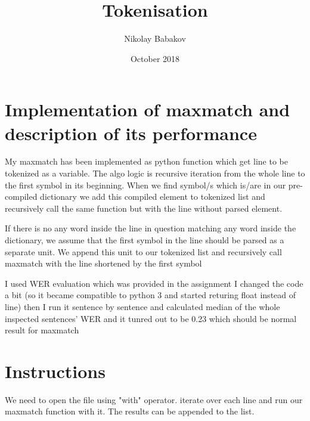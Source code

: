 \documentclass{article}
\title{Tokenisation}
\author{Nikolay Babakov }
\date{October 2018}
\begin{document}
\maketitle

\section{Implementation of maxmatch and description of its performance}
My maxmatch has been implemented as python function which get line to be tokenized as a variable. 
The algo logic is recursive iteration from the whole line to the first symbol in its beginning. 
When we find symbol/s which is/are in our pre-compiled dictionary we add this compiled element to tokenized list 
and recursively call the same function but with the line without parsed element. \newline

If there is no any word inside the line in question matching any word inside the dictionary, 
we assume that the first symbol in the line should be parsed as a separate unit. 
We append this unit to our tokenized list and recursively call maxmatch with the line shortened by the first symbol

I used WER evaluation which was provided in the assignment
I changed the code a bit (so it became compatible to python 3 and started returing float instead of line)
then I run it sentence by sentence and calculated median of the whole inspected sentences' WER and it tunred out to be 0.23 
which should be normal result for maxmatch 

\section{Instructions }
We need to open the file using "with" operator. iterate over each line and run our maxmatch function with it. The results can be appended to the list.
\end{document}
